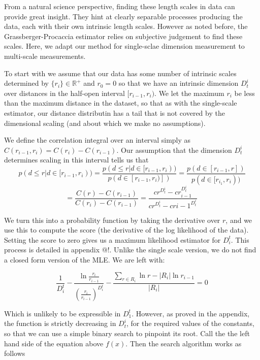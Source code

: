 \documentclass[11pt]{article}
\begin{document}
From a natural science perspective, finding these length scales in data can provide great insight. They hint at clearly separable processes producing the data, each with their own intrinsic length scales. However as noted before, the Grassberger-Procaccia estimator relies on subjective judgement to find these scales. Here, we adapt our method for single-sclae dimension measurement to multi-scale measurements.

To start with we assume that our data has some number of intrinsic scales determined by $\{r_i\} \in {\mathbb R}^+$ and $r_0 = 0$ so that we have an intrinsic dimension $D_t^i$ over distances in the half-open interval $[r_{i-1}, r_{i})$. We let the maximum $r_i$ be less than the maximum distance in the dataset, so that as with the single-scale estimator, our distance distributin has a tail that is not covered by the dimensional scaling (and about which we make no assumptions).

We define the correlation integral over an interval simply as $C(r_{i-1}, r_i) = C(r_i) - C(r_{i-1})$. Our assumption that the dimension $D_t^i$ determines scaling in this interval tells us that 
\[
p(d \leq r | d \in [r_{i-1}, r_i)) = \frac{p(d \leq r | d \in [r_{i-1}, r_i))}{p(d \in [r_{i-1}, r_i)])} = \frac{p(d \in [r_{i-1}, r])}{p(d \in [r_{i_1}, r_i))}
\]
\[
 = \frac{C(r) - C(r_{i-1})}{C(r_i) - C(r_{i-1})} = \frac{cr^{D^i_t} - cr_{i-1}^{D^i_t}}{cr^{D^i_t} - cr{i-1}^{D^i_t}}\
\]

We turn this into a probability function by taking the derivative over $r$, and we use this to compute the score (the derivative of the log likelihood of the data). Setting the score to zero gives us a maximum likelihood estimator for $D^t_i$. This process is detailed in appendix @!. Unlike the single scale version, we do not find a closed form version of the MLE. We are left with:

\[
\frac{1}{D^t_i} - \frac{\ln \frac{r_i}{r_{i-1}}}{(\frac{r_i}{r_{i-1}})^{D^t_i}} - \frac{\sum_{r \in R_i}\ln r - |R_i| \ln r_{i-1}}{|R_i|}= 0
\]

Which is unlikely to be expressible in $D^t_1$. However, as proved in the appendix, the function is strictly decreasing in $D^i_t$, for the required values of the constants, so that we can use a simple binary search to pinpoint its root. Call the the left hand side of the equation above $f(x)$. Then the search algorithm works as follows
\end{document}
